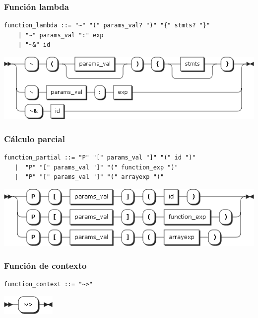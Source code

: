 \subsubsection {Función lambda}
\begin{lstlisting}[style=nonumbers]
function_lambda ::= "~" "(" params_val? ")" "{" stmts? "}"
    | "~" params_val ":" exp
    | "~&" id
\end{lstlisting}
\begin{center}
\includegraphics[scale=0.5]{diagram/function_lambda.png} \\
\end{center}
\subsubsection {Cálculo parcial}
\begin{lstlisting}[style=nonumbers]
function_partial ::= "P" "[" params_val "]" "(" id ")"
   |  "P" "[" params_val "]" "(" function_exp ")"
   |  "P" "[" params_val "]" "(" arrayexp ")"
\end{lstlisting}
\begin{center}
\includegraphics[scale=0.5]{diagram/function_partial.png} \\
\end{center}
\subsubsection {Función de contexto}
\begin{lstlisting}[style=nonumbers]
function_context ::= "~>"
\end{lstlisting}
\begin{center}
\includegraphics[scale=0.5]{diagram/function_context.png} \\
\end{center}


